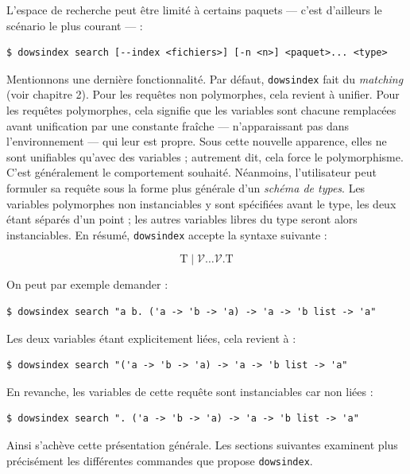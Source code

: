 \documentclass[a4paper]{report}
\theoremstyle{definition}
\newcommand{\dowsindex}{\texttt{dowsindex}\xspace}
\newcommand{\V}{\mathscr{V}}
\newcommand{\T}{\mathrm{T}}
\begin{document}
L'espace de recherche peut être limité à certains paquets — c'est d'ailleurs le scénario le plus courant — :

\begin{verbatim}
$ dowsindex search [--index <fichiers>] [-n <n>] <paquet>... <type>
\end{verbatim}

Mentionnons une dernière fonctionnalité. Par défaut, \dowsindex fait du \emph{matching} (voir chapitre 2). Pour les requêtes non polymorphes, cela revient à unifier. Pour les requêtes polymorphes, cela signifie que les variables sont chacune remplacées avant unification par une constante fraîche — n'apparaissant pas dans l'environnement — qui leur est propre. Sous cette nouvelle apparence, elles ne sont unifiables qu'avec des variables ; autrement dit, cela force le polymorphisme. C'est généralement le comportement souhaité. Néanmoins, l'utilisateur peut formuler sa requête sous la forme plus générale d'un \emph{schéma de types}. Les variables polymorphes non instanciables y sont spécifiées avant le type, les deux étant séparés d'un point ; les autres variables libres du type seront alors instanciables. En résumé, \dowsindex accepte la syntaxe suivante :

\[ \T \mid \V \dots \V \texttt{.} \T \]

On peut par exemple demander :

\begin{verbatim}
$ dowsindex search "a b. ('a -> 'b -> 'a) -> 'a -> 'b list -> 'a"
\end{verbatim}

Les deux variables étant explicitement liées, cela revient à :

\begin{verbatim}
$ dowsindex search "('a -> 'b -> 'a) -> 'a -> 'b list -> 'a"
\end{verbatim}

En revanche, les variables de cette requête sont instanciables car non liées :

\begin{verbatim}
$ dowsindex search ". ('a -> 'b -> 'a) -> 'a -> 'b list -> 'a"
\end{verbatim}

Ainsi s'achève cette présentation générale. Les sections suivantes examinent plus précisément les différentes commandes que propose \dowsindex.

\end{document}
